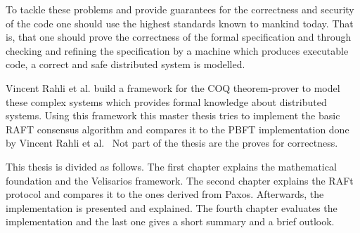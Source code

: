 To tackle these problems and provide guarantees for the correctness and
security of the code one should use the highest standards known to mankind
today. That is, that one should prove the correctness of the formal specification and
through checking and refining the specification by a machine which produces
executable code, a correct and safe distributed system is modelled.~\cite{rahli2018velisarios}

Vincent Rahli et al. build a framework for the COQ theorem-prover
to model these complex systems which provides formal knowledge about distributed
systems. Using this framework this master thesis tries to implement
the basic RAFT consensus algorithm and compares it to the PBFT implementation
done by Vincent Rahli et al.~\cite{rahli2018velisarios}
Not part of the thesis are the proves for correctness.

This thesis is divided as follows. The first chapter explains the
mathematical foundation and the Velisarios framework. The second chapter
explains the RAFt protocol and compares it to the ones derived from Paxos.
Afterwards, the implementation is presented and explained. The fourth chapter
evaluates the implementation and the last one gives a short summary and a
brief outlook.





